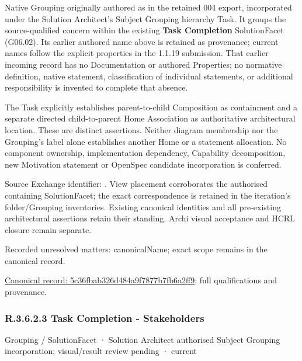 Native Grouping originally authored as \texttt{} in the retained 004 export,
incorporated under the Solution Architect's Subject Grouping hierarchy Task.
It groups the source-qualified \texttt{} concern within
the existing \textbf{Task Completion} SolutionFacet (G06.02). Its earlier authored name above is retained as provenance; current names
follow the explicit properties in the 1.1.19 submission.
That earlier incoming record has no Documentation or authored Properties; no normative
definition, native statement, classification of individual statements, or
additional responsibility is invented to complete that absence.



The Task explicitly establishes parent-to-child Composition as containment and
a separate directed child-to-parent Home Association as authoritative architectural
location. These are distinct assertions. Neither diagram membership nor the
Grouping's label alone establishes another Home or a statement allocation.
No component ownership, implementation dependency, Capability decomposition,
new Motivation statement or OpenSpec candidate incorporation is conferred.



Source Exchange identifier: \texttt{}. View placement corroborates
the authorised containing SolutionFacet; the exact correspondence is retained in the
iteration's folder/Grouping inventories. Existing canonical identities and all
pre-existing architectural assertions retain their standing. Archi visual
acceptance and HCRL closure remain separate.


{\small Recorded unresolved matters: canonicalName; exact scope remains in the canonical record.}\par
{\footnotesize \href{../../../../../../../continuum/grouping/5c36fbab326d484a9f7877b7fb6a2ff9.md}{Canonical record: 5c36fbab326d484a9f7877b7fb6a2ff9}; full qualifications and provenance.}\par
\subsubsection*{R.3.6.2.3 Task Completion - Stakeholders}
\label{navigation:R.3.6.2.3}

\label{element:3b06c335246c4307adb5801e05f2cef4}
{\small Grouping / SolutionFacet · Solution Architect authorised Subject Grouping incorporation; visual/result review pending · current}\par

